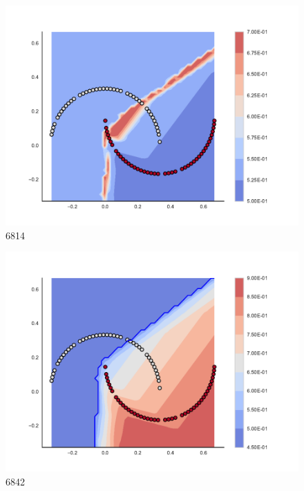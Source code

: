 \begin{subfigure}[b]{0.09\textwidth}
    \includegraphics[clip, trim=2.35cm 1.75cm 4.5cm 0cm,width=\textwidth]{img/convergence/6814.pdf}
    \caption{6814}
    \label{fig:convergence_6814}
\end{subfigure}
%
\begin{subfigure}[b]{0.09\textwidth}
    \includegraphics[clip, trim=2.35cm 1.75cm 4.5cm 0cm,width=\textwidth]{img/convergence/6842.pdf}
    \caption{6842}
    \label{fig:convergence_6842}
\end{subfigure}
%
